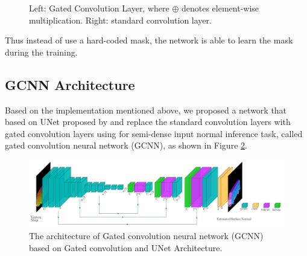\begin{figure}[H]
	\decoRule
	\caption{Left: Gated Convolution Layer, where $ \oplus $ denotes element-wise multiplication. Right: standard convolution layer.}
	\label{fig:gconvLayer}
\end{figure}

Thus instead of use a hard-coded mask, the network is able to learn the mask during the training. 

\subsection{GCNN Architecture}
\label{sec:architecture}

Based on the implementation mentioned above, we proposed a network that based on UNet proposed by \cite{unet} and replace the standard convolution layers with gated convolution layers using for semi-dense input normal inference task, called gated convolution neural network (GCNN), as shown in Figure \ref{fig:gcnn-archi}. 


\begin{figure}
	\centering
	\includegraphics[width=1\textwidth]{Figures/gcnn}
	\caption{The architecture of Gated convolution neural network (GCNN) based on Gated convolution and UNet Architecture.}
	\label{fig:gcnn-archi}
\end{figure}

